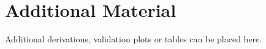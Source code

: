 \chapter{Additional Material}
\label{app:additional}

Additional derivations, validation plots or tables can be placed here.
